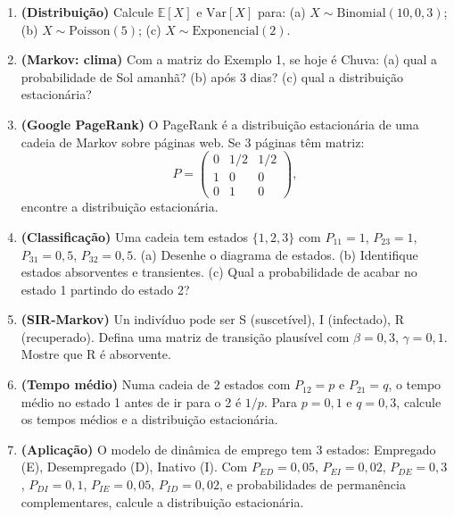 \documentclass[12pt,a4paper]{article}
\begin{document}
\begin{enumerate}
  \item \textbf{(Distribui\c{c}\~ao)} Calcule $\mathbb{E}[X]$ e $\text{Var}[X]$ para: (a) $X \sim \text{Binomial}(10, 0{,}3)$; (b) $X \sim \text{Poisson}(5)$; (c) $X \sim \text{Exponencial}(2)$.
  
  \item \textbf{(Markov: clima)} Com a matriz do Exemplo 1, se hoje \'e Chuva: (a) qual a probabilidade de Sol amanh\~a? (b) ap\'os 3 dias? (c) qual a distribui\c{c}\~ao estacion\'aria?
  
  \item \textbf{(Google PageRank)} O PageRank \'e a distribui\c{c}\~ao estacion\'aria de uma cadeia de Markov sobre p\'aginas web. Se 3 p\'aginas t\^em matriz:
  \[
  P = \begin{pmatrix} 0 & 1/2 & 1/2 \\ 1 & 0 & 0 \\ 0 & 1 & 0 \end{pmatrix},
  \]
  encontre a distribui\c{c}\~ao estacion\'aria.
  
  \item \textbf{(Classifica\c{c}\~ao)} Uma cadeia tem estados $\{1, 2, 3\}$ com $P_{11}=1$, $P_{23}=1$, $P_{31}=0{,}5$, $P_{32}=0{,}5$. (a) Desenhe o diagrama de estados. (b) Identifique estados absorventes e transientes. (c) Qual a probabilidade de acabar no estado 1 partindo do estado 2?
  
  \item \textbf{(SIR-Markov)} Un indiv\'iduo pode ser S (suscet\'ivel), I (infectado), R (recuperado). Defina uma matriz de transi\c{c}\~ao plaus\'ivel com $\beta=0{,}3$, $\gamma=0{,}1$. Mostre que R \'e absorvente.
  
  \item \textbf{(Tempo m\'edio)} Numa cadeia de 2 estados com $P_{12}=p$ e $P_{21}=q$, o tempo m\'edio no estado 1 antes de ir para o 2 \'e $1/p$. Para $p=0{,}1$ e $q=0{,}3$, calcule os tempos m\'edios e a distribui\c{c}\~ao estacion\'aria.
  
  \item \textbf{(Aplica\c{c}\~ao)} O modelo de din\^amica de emprego tem 3 estados: Empregado (E), Desempregado (D), Inativo (I). Com $P_{ED}=0{,}05$, $P_{EI}=0{,}02$, $P_{DE}=0{,}3$, $P_{DI}=0{,}1$, $P_{IE}=0{,}05$, $P_{ID}=0{,}02$, e probabilidades de perman\^encia complementares, calcule a distribui\c{c}\~ao estacion\'aria.
\end{enumerate}
\end{document}
